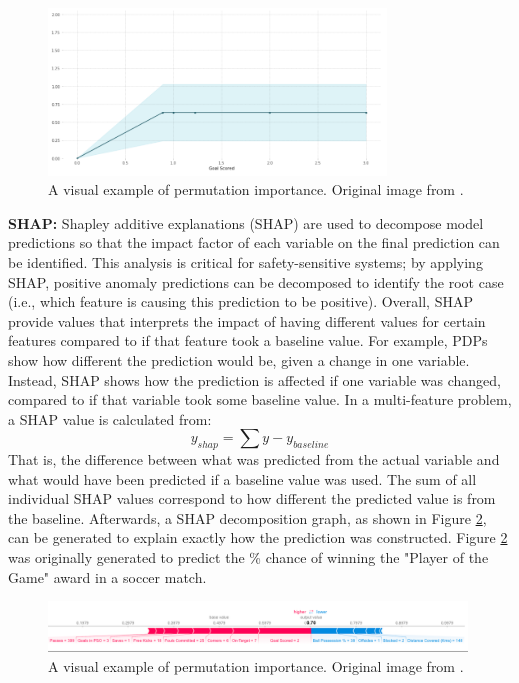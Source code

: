\begin{figure}[H]
    \centering
    \includegraphics[width=0.8\textwidth]{images/ch3/pdp.jpeg}
    \caption{A visual example of permutation importance. Original image from \cite{pdp_plot}.}
    \label{fig:03pdp}
\end{figure}


\textbf{SHAP:} Shapley additive explanations (SHAP) are used to decompose model predictions so that the impact factor of each variable on the final prediction can be identified.  This analysis is critical for safety-sensitive systems; by applying SHAP, positive anomaly predictions can be decomposed to identify the root case (i.e., which feature is causing this prediction to be positive).  Overall, SHAP provide values that interprets the impact of having different values for certain features compared to if that feature took a baseline value.  For example, PDPs show how different the prediction would be, given a change in one variable. Instead, SHAP shows how the prediction is affected if one variable was changed, compared to if that variable took some baseline value.  In a multi-feature problem, a SHAP value is calculated from:
\begin{equation}
    y_{shap} = \sum y - y_{baseline}
    \label{eq:03SHAP}
\end{equation}
That is, the difference between what was predicted from the actual variable and what would have been predicted if a baseline value was used. The sum of all individual SHAP values correspond to how different the predicted value is from the baseline. Afterwards, a SHAP decomposition graph, as shown in Figure \ref{fig:03SHAPFig}, can be generated to explain exactly how the prediction was constructed.  Figure \ref{fig:03SHAPFig} was originally generated to predict the \% chance of winning the "Player of the Game" award in a soccer match.

\begin{figure}[H]
    \centering
    \includegraphics[width=0.99\textwidth]{images/ch3/SHAP.jpeg}
    \caption{A visual example of permutation importance. Original image from \cite{SHAP_plot}.}
    \label{fig:03SHAPFig}
\end{figure}

